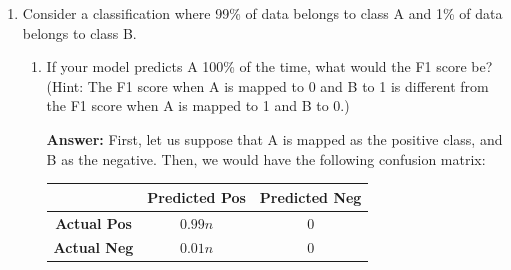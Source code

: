 \documentclass{article}
\newenvironment{QandA}{\begin{enumerate}[label=\arabic*.]}{\end{enumerate}}
\newenvironment{InnerQandA}{\begin{enumerate}[label=\roman*.]}{\end{enumerate}}
\newenvironment{answer}{\par\normalfont \textbf{Answer:}}{}
\begin{document}
\begin{QandA}
    \begin{InnerQandA}
        \item Calculate the model’s precision, recall, and F1.
        \begin{answer}
            \begin{align*}
                \text{Precision} &= \frac{\text{TP}}{\text{TP} + \text{FP}} = \frac{30}{30 + 5} = 0.85\\
                \text{Recall} &= \frac{\text{TP}}{\text{TP} + \text{FN}} = \frac{30}{30 + 20} = 0.6\\
                \text{F}_1 &= \frac{2 \cdot \text{Precision} \cdot \text{Recall}}{\text{Precision} + \text{Recall}} = \frac{2 \cdot 0.85 \cdot 0.6}{0.85 + 0.6} = 0.7034
            \end{align*}
        \end{answer}

        \item What can we do to improve the model’s performance?
        \begin{answer}
            The model is very conservative, in the sense that it rarely outputs the positive class (large number of False Negatives). The goal of improving the model's performance might be achieved by being more aggressive, and predicting the positive class more often. One way to do this is by lowering the threshold for which we predict a positive vs. negative class.
        \end{answer}
    \end{InnerQandA}

    \item Consider a classification where 99\% of data belongs to class A and 1\% of data belongs to class B.
    \begin{InnerQandA}
         \item If your model predicts A 100\% of the time, what would the F1 score be? (Hint: The F1 score when A is mapped to 0 and B to 1 is different from the F1 score when A is mapped to 1 and B to 0.)
         \begin{answer}
             First, let us suppose that A is mapped as the positive class, and B as the negative. Then, we would have the following confusion matrix:
            \begin{table}[htb!]
            \centering
            \begin{tabular}{|c|c|c|}
            \hline
                                  & \textbf{Predicted Pos} & \textbf{Predicted Neg} \\ \hline
            \textbf{Actual Pos}  & $0.99n$                      & 0                       \\ \hline
            \textbf{Actual Neg} & $0.01n$                       & 0                       \\ \hline
            \end{tabular}
            \end{table}


\end{answer}
\end{InnerQandA}
\end{QandA}
\end{document}
